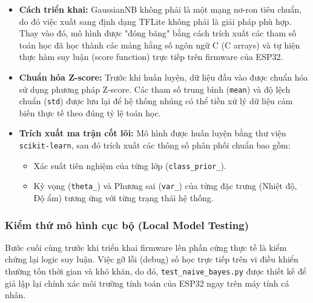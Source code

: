 \begin{itemize}
    \item \textbf{Cách triển khai:} GaussianNB không phải là một mạng nơ-ron tiêu chuẩn, do đó việc xuất sang định dạng TFLite không phải là giải pháp phù hợp. Thay vào đó, mô hình được "đóng băng" bằng cách trích xuất các tham số toán học đã học thành các mảng hằng số ngôn ngữ C (C arrays) và tự hiện thực hàm suy luận (score function) trực tiếp trên firmware của ESP32.
    \item \textbf{Chuẩn hóa Z-score:} Trước khi huấn luyện, dữ liệu đầu vào được chuẩn hóa sử dụng phương pháp Z-score. Các tham số trung bình (\texttt{mean}) và độ lệch chuẩn (\texttt{std}) được lưu lại để hệ thống nhúng có thể tiền xử lý dữ liệu cảm biến thực tế theo đúng tỷ lệ toán học.
    \item \textbf{Trích xuất ma trận cốt lõi:} Mô hình được huấn luyện bằng thư viện \texttt{scikit-learn}, sau đó trích xuất các thông số phân phối chuẩn bao gồm:
    \begin{itemize}
        \item Xác suất tiên nghiệm của từng lớp (\texttt{class\_prior\_}).
        \item Kỳ vọng (\texttt{theta\_}) và Phương sai (\texttt{var\_}) của từng đặc trưng (Nhiệt độ, Độ ẩm) tương ứng với từng trạng thái hệ thống.
    \end{itemize}
\end{itemize}



\subsubsection{Kiểm thử mô hình cục bộ (Local Model Testing)}

Bước cuối cùng trước khi triển khai firmware lên phần cứng thực tế là kiểm chứng lại logic suy luận. Việc gỡ lỗi (debug) số học trực tiếp trên vi điều khiển thường tốn thời gian và khó khăn, do đó, \texttt{test\_naive\_bayes.py} được thiết kế để giả lập lại chính xác môi trường tính toán của ESP32 ngay trên máy tính cá nhân.

